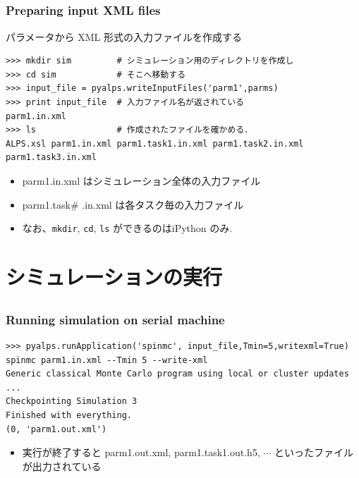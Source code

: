 \subsection*{\redm\whiteb\greenb}
\begin{frame}[t,fragile]
\frametitle{Preparing input XML files}
パラメータから XML 形式の入力ファイルを作成する
\begin{lstlisting}
>>> mkdir sim         # シミュレーション用のディレクトリを作成し
>>> cd sim            # そこへ移動する
>>> input_file = pyalps.writeInputFiles('parm1',parms)
>>> print input_file  # 入力ファイル名が返されている
parm1.in.xml
>>> ls                # 作成されたファイルを確かめる．
ALPS.xsl parm1.in.xml parm1.task1.in.xml parm1.task2.in.xml parm1.task3.in.xml
\end{lstlisting}
\begin{itemize}
 \item parm1.in.xml はシミュレーション全体の入力ファイル
 \item parm1.task\# .in.xml は各タスク毎の入力ファイル
 \item なお、\verb|mkdir|, \verb|cd|, \verb|ls| ができるのはiPython のみ.
\end{itemize}

\end{frame}

\section{シミュレーションの実行}

\subsection*{\redm\whiteb\greenb}
\begin{frame}[t,fragile]
\frametitle{Running simulation on serial machine}
\begin{lstlisting}
>>> pyalps.runApplication('spinmc', input_file,Tmin=5,writexml=True)
spinmc parm1.in.xml --Tmin 5 --write-xml
Generic classical Monte Carlo program using local or cluster updates
...
Checkpointing Simulation 3
Finished with everything.
(0, 'parm1.out.xml')
\end{lstlisting}
\begin{itemize}
\item 実行が終了すると parm1.out.xml, parm1.task1.out.h5, $\cdots$ といったファイルが出力されている
\end{itemize}
\end{frame}

